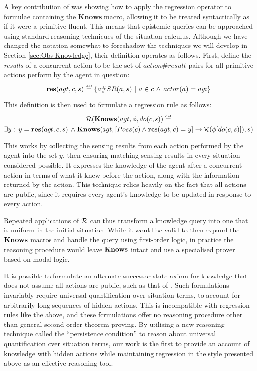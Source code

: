 A key contribution of \citet{scherl03sc_knowledge} was showing how
to apply the regression operator to formulae containing the $\mathbf{Knows}$
macro, allowing it to be treated syntactically as if it were a primitive
fluent. This means that epistemic queries can be approached using
standard reasoning techniques of the situation calculus. Although
we have changed the notation somewhat to foreshadow the techniques
we will develop in Section \ref{sec:Obs-Knowledge}, their definition
operates as follows. First, define the \emph{results} of a concurrent
action to be the set of $action\#result$ pairs for all primitive
actions perform by the agent in question:\[
\mathbf{res}(agt,c,s)\stackrel{\mbox{\tiny def}}{=}\{a\#SR(a,s)\,\,|\,\, a\in c\,\wedge\, actor(a)=agt\}\]


This definition is then used to formulate a regression rule as follows:\begin{multline}
\mathcal{R}(\mathbf{Knows}(agt,\phi,do(c,s))\stackrel{\mbox{\tiny def}}{=}\\
\exists y:\, y=\mathbf{res}(agt,c,s)\,\wedge\mathbf{Knows}(agt,\left[Poss(c)\wedge\mathbf{res}(agt,c)=y\right]\rightarrow\mathcal{R}(\phi[do(c,s)]),s)\label{eq:reg_k_std}\end{multline}


This works by collecting the sensing results from each action performed
by the agent into the set $y$, then ensuring matching sensing results
in every situation considered possible. It expresses the knowledge
of the agent after a concurrent action in terms of what it knew before
the action, along with the information returned by the action. This
technique relies heavily on the fact that all actions are public,
since it requires every agent's knowledge to be updated in response
to every action.

Repeated applications of $\mathcal{R}$ can thus transform a knowledge query
into one that is uniform in the initial situation. While it would
be valid to then expand the $\mathbf{Knows}$ macros and handle the query
using first-order logic, in practice the reasoning procedure would
leave $\mathbf{Knows}$ intact and use a specialised prover based on modal
logic.

It is possible to formulate an alternate successor state axiom for
knowledge that does not assume all actions are public, such as that
of \citet{Lesperance99sitcalc_approach}. Such formulations invariably
require universal quantification over situation terms, to account
for arbitrarily-long sequences of hidden actions. This is incompatible
with regression rules like the above, and these formulations offer
no reasoning procedure other than general second-order theorem proving.
By utilising a new reasoning technique called the {}``persistence
condition'' to reason about universal quantification over situation
terms, our work is the first to provide an account of knowledge with
hidden actions while maintaining regression in the style presented
above as an effective reasoning tool.


